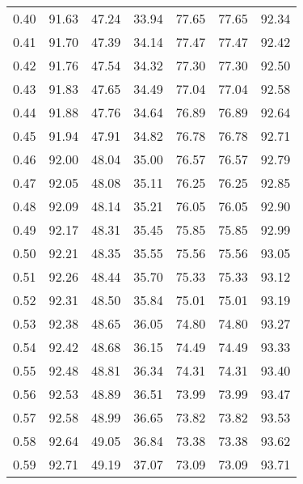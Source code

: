 \begin{tabular}{|c|c|c|c|c|c|c|}
      0.40 &     91.63 &     47.24 &      33.94 &   77.65 &      77.65 &         92.34 \\
      0.41 &     91.70 &     47.39 &      34.14 &   77.47 &      77.47 &         92.42 \\
      0.42 &     91.76 &     47.54 &      34.32 &   77.30 &      77.30 &         92.50 \\
      0.43 &     91.83 &     47.65 &      34.49 &   77.04 &      77.04 &         92.58 \\
      0.44 &     91.88 &     47.76 &      34.64 &   76.89 &      76.89 &         92.64 \\
      0.45 &     91.94 &     47.91 &      34.82 &   76.78 &      76.78 &         92.71 \\
      0.46 &     92.00 &     48.04 &      35.00 &   76.57 &      76.57 &         92.79 \\
      0.47 &     92.05 &     48.08 &      35.11 &   76.25 &      76.25 &         92.85 \\
      0.48 &     92.09 &     48.14 &      35.21 &   76.05 &      76.05 &         92.90 \\
      0.49 &     92.17 &     48.31 &      35.45 &   75.85 &      75.85 &         92.99 \\
      0.50 &     92.21 &     48.35 &      35.55 &   75.56 &      75.56 &         93.05 \\
      0.51 &     92.26 &     48.44 &      35.70 &   75.33 &      75.33 &         93.12 \\
      0.52 &     92.31 &     48.50 &      35.84 &   75.01 &      75.01 &         93.19 \\
      0.53 &     92.38 &     48.65 &      36.05 &   74.80 &      74.80 &         93.27 \\
      0.54 &     92.42 &     48.68 &      36.15 &   74.49 &      74.49 &         93.33 \\
      0.55 &     92.48 &     48.81 &      36.34 &   74.31 &      74.31 &         93.40 \\
      0.56 &     92.53 &     48.89 &      36.51 &   73.99 &      73.99 &         93.47 \\
      0.57 &     92.58 &     48.99 &      36.65 &   73.82 &      73.82 &         93.53 \\
      0.58 &     92.64 &     49.05 &      36.84 &   73.38 &      73.38 &         93.62 \\
      0.59 &     92.71 &     49.19 &      37.07 &   73.09 &      73.09 &         93.71 \\

\end{tabular}
